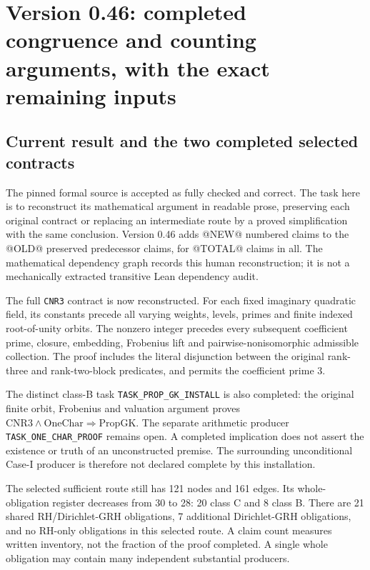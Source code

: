 \section{Version 0.46: completed congruence and counting arguments, with the exact remaining inputs}
\label{sec:dependency-audit-v46}

\subsection{Current result and the two completed selected contracts}

The pinned formal source is accepted as fully checked and correct.
The task here is to reconstruct its mathematical argument in readable
prose, preserving each original contract or replacing an intermediate
route by a proved simplification with the same conclusion.
Version 0.46 adds @NEW@ numbered claims to the @OLD@ preserved predecessor
claims, for @TOTAL@ claims in all. The mathematical dependency graph
records this human reconstruction; it is not a mechanically extracted
transitive Lean dependency audit.

The full \texttt{CNR3} contract is now reconstructed. For each fixed
imaginary quadratic field, its constants precede all varying weights,
levels, primes and finite indexed root-of-unity orbits. The nonzero
integer precedes every subsequent coefficient prime, closure, embedding,
Frobenius lift and pairwise-nonisomorphic admissible collection. The
proof includes the literal disjunction between the original rank-three
and rank-two-block predicates, and permits the coefficient prime 3.

The distinct class-B task \texttt{TASK\_PROP\_GK\_INSTALL} is also
completed: the original finite orbit, Frobenius and valuation argument
proves \(\mathrm{CNR3}\land\mathrm{OneChar}\Rightarrow
\mathrm{PropGK}\). The separate arithmetic producer
\texttt{TASK\_ONE\_CHAR\_PROOF} remains open. A completed implication
does not assert the existence or truth of an unconstructed premise.
The surrounding unconditional Case-I producer is therefore not declared
complete by this installation.

The selected sufficient route still has 121 nodes and 161 edges.
Its whole-obligation register decreases from 30 to 28: 20 class C and
8 class B. There are 21 shared RH/Dirichlet-GRH obligations, 7 additional
Dirichlet-GRH obligations, and no RH-only obligations in this selected
route. A claim count measures written inventory, not the fraction of
the proof completed. A single whole obligation may contain many
independent substantial producers.

